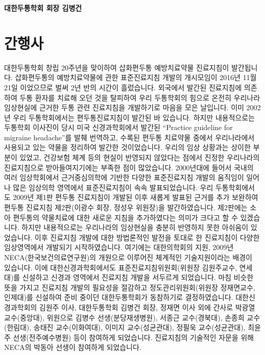 \documentclass[]{book}
\begin{document}
\textbf{대한두통학회 회장 김병건}

\hypertarget{section-2}{%
\chapter*{간행사}\label{section-2}}

대한두통학회 창립 20주년을 맞이하여 삽화편두통 예방치료약물 진료지침이 발간됩니다. 삽화편두통의 예방치료약물에 관한 표준진료지침 개발의 개시모임이 2016년 11월 21일 이었으므로 벌써 2년 반의 시간이 흘렀습니다. 외국에서 발간된 진료지침에 의존하여 두통 환자를 치료해 오던 것을 탈피하여 우리 두통학회의 힘으로 온전히 우리나라 임상현실에 근거한 두통 관련 진료지침을 개발하기로 마음을 모은 날입니다.
이미 2002년 우리 두통학회에서는 편두통진료지침이 발간된 바 있습니다. 하지만 내용적으로는 두통학회 이사진이 당시 미국 신경과학회에서 발간된 ``Practice guideline for migraine headache''를 발췌 번역하고, 수록된 편두통 치료약물 중에서 우리나라에서 사용되고 있는 약물을 정리하여 발간한 것이었습니다. 우리의 임상 상황과는 상이한 부분이 있었고, 건강보험 체계 등의 현실이 반영되지 않았다는 점에서 진정한 우리나라의 진료지침으로 받아들여지기에는 부족한 점이 많았습니다. 2000년대에 들어서 국내의 여러 임상학회에서 근거중심의학에 기반한 다양한 표준진료지침 개발의 움직임이 일어나 많은 임상의학 영역에서 표준진료지침이 속속 발표되었습니다. 우리 두통학회에서도 2009년 제1판 편두통 진료지침이 개발된 이후 새롭게 발표된 근거를 추가 보완하여 편두통 진료지침 제2판(이광수 회장, 정성우 위원장)을 발간하였습니다. 제2판에는 소아 편두통의 약물치료에 대한 새로운 지침을 추가하였다는 의미가 크다고 할 수 있겠습니다. 하지만 내용적으로는 우리나라의 임상현실을 충분히 반영하지 못한 아쉬움이 있었습니다. 이후 진료지침 개발에 대한 방법론적인 발전을 토대로 한 진료지침이 다양한 임상영역에서 개발되기 시작하였습니다. 여기에는 대한의학회의 지원, 2009년 NECA(한국보건의료연구원)의 개원으로 이루어진 체계적인 기술지원이라는 배경이 있습니다. 이에 대한신경과학회에서도 표준진료지침위원회(위원장 김원주교수, 연세대)를 신설하고 신경과 영역에서 진료지침 개발을 서두르게 되었습니다. 마침 비슷한 뜻을 가지고 진료지침 개발의 필요성을 절감하고 정도관리위원회(위원장 정재면교수, 인제대)를 신설하여 준비 중이던 대한두통학회가 동참하기로 결정하였습니다. 대한신경과학회의 김원주 이사, 대한두통학회 김병건 회장, 정재면 이사 외에 간사로 박광열 교수(중앙대), 위원으로 김병수 선생(분당재생병원), 서종근 교수(경북대), 손종희 교수(한림대), 송태진 교수(이화여대), 이미지 교수(성균관대), 정필욱 교수(성균관대), 최윤주 선생(전주예수병원) 등이 참여하게 되었습니다. 진료지침의 기술적인 자문을 위해 NECA의 박동아 선생이 참여하게 되었습니다.
\end{document}
